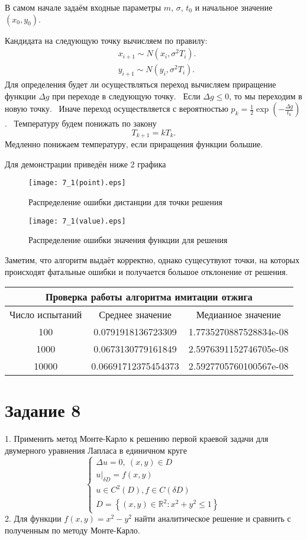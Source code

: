 \documentclass[11pt]{article}
\begin{document}
В самом начале задаём входные параметры $m$, $\sigma$, $t_0$ и начальное значение $(x_0, y_0)$.

Кандидата на следующую точку вычисляем по правилу:
$$
\begin{aligned}
    & x_{i+1} \sim N ( x_i, \sigma^2 T_i). \\
    & y_{i+1} \sim N ( y_i, \sigma^2 T_i).
\end{aligned}
$$
Для определения будет ли осуществляться переход вычисляем приращение функции $\Delta g$ при переходе в следующую точку. \
Если $\Delta g \leqslant 0$, то мы переходим в новую точку. \
Иначе переход осуществляется с вероятностью $p_k = \frac{1}{2} \exp(- \frac{\Delta g}{t_k})$. \
Температуру будем понижать по закону
$$
    T_{k+1} = k T_k.
$$
Медленно понижаем температуру, если приращения функции большие.

Для демонстрации приведён ниже 2 графика

\begin{figure}[ht]
    \texttt{[image: 7\_1(point).eps]} 
    \caption{Распределение ошибки дистанции для точки решения}
\end{figure} 

\begin{figure}[ht]
    \texttt{[image: 7\_1(value).eps]} 
    \caption{Распределение ошибки значения функции для решения}
\end{figure} 
\FloatBarrier

Заметим, что алгоритм выдаёт корректно, однако сущесутвуют точки, на которых происходят фатальные ошибки и получается большое отклонение от решения. 

\begin{tabular}{|c|c|c|}
\hline
\multicolumn{3}{|c|}{Проверка работы алгоритма имитации отжига} \\
\hline
Число испытаний & Среднее значение & Медианное значение \\
\hline
100 & 0.0791918136723309 & 1.7735270887528834e-08 \\
1000 & 0.0673130779161849 & 2.5976391152746705e-08 \\
10000 & 0.06691712375454373 & 2.5927705760100567e-08 \\
\hline
\end{tabular}


\section{Задание 8}
1. Применить метод Монте-Карло к решению первой краевой задачи для двумерного уравнения Лапласа в единичном круге
$$
    \begin{cases}
    \Delta u=0,~ (x, y) \in D \\
    \left.u\right|_{\delta D}=f(x, y) \\
    u \in C^2(D), f \in C(\delta D) \\
    D=\left\{(x, y) \in \mathbb{R}^2: x^2+y^2 \leqslant 1\right\}
    \end{cases}
$$
2. Для функции $f(x, y)=x^2-y^2$ найти аналитическое решение и сравнить с полученным по методу Монте-Карло.
\end{document}
